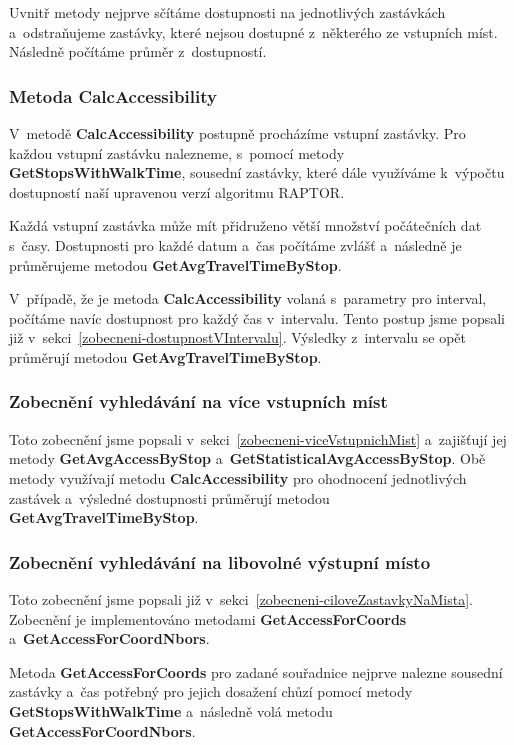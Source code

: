 Uvnitř metody nejprve sčítáme dostupnosti na jednotlivých zastávkách a~odstraňujeme zastávky, které nejsou dostupné z~některého ze vstupních míst. Následně počítáme průměr z~dostupností.

\subsubsection{Metoda CalcAccessibility}\label{Metoda-CalcAccessibility}

V~metodě \textbf{CalcAccessibility} postupně procházíme vstupní zastávky. Pro každou vstupní zastávku nalezneme, s~pomocí metody \textbf{GetStopsWithWalkTime}, sousední zastávky, které dále využíváme k~výpočtu dostupností naší upravenou verzí algoritmu RAPTOR.

Každá vstupní zastávka může mít přidruženo větší množství počátečních dat s~časy. Dostupnosti pro každé datum a~čas počítáme zvlášť a~následně je průměrujeme metodou \textbf{GetAvgTravelTimeByStop}.

V~případě, že je metoda \textbf{CalcAccessibility} volaná s~parametry pro interval, počítáme navíc dostupnost pro každý čas v~intervalu. Tento postup jsme popsali již v~sekci~\ref{zobecneni-dostupnostVIntervalu}. Výsledky z~intervalu se opět průměrují metodou \textbf{GetAvgTravelTimeByStop}.

\subsubsection{Zobecnění vyhledávání na více vstupních míst}

Toto zobecnění jsme popsali v~sekci~\ref{zobecneni-viceVstupnichMist} a~zajišťují jej metody \textbf{GetAvgAccessByStop} a~\textbf{GetStatisticalAvgAccessByStop}. Obě metody využívají metodu \textbf{CalcAccessibility} pro ohodnocení jednotlivých zastávek a~výsledné dostupnosti průměrují metodou \textbf{GetAvgTravelTimeByStop}.

\subsubsection{Zobecnění vyhledávání na libovolné výstupní místo}

Toto zobecnění jsme popsali již v~sekci~\ref{zobecneni-ciloveZastavkyNaMista}. Zobecnění je implementováno metodami \textbf{GetAccessForCoords} a~\textbf{GetAccessForCoordNbors}.

Metoda \textbf{GetAccessForCoords} pro zadané souřadnice nejprve nalezne sousední zastávky a~čas potřebný pro jejich dosažení chůzí pomocí metody \textbf{GetStopsWithWalkTime} a~následně volá metodu \textbf{GetAccessForCoordNbors}.

